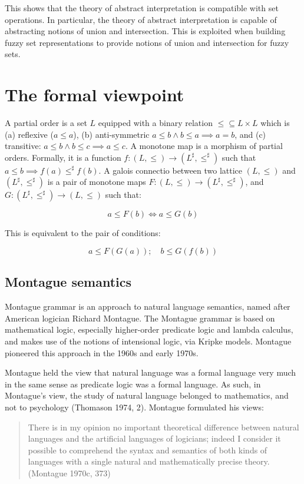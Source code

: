 \documentclass[11pt]{book}
\begin{document}
This shows that the theory of abstract interpretation is compatible with set operations. In particular, the theory of abstract interpretation is capable of abstracting notions of union and intersection. This is exploited when building fuzzy set representations to provide notions of union and intersection for fuzzy sets.

\section{The formal viewpoint}

A partial order is a set $L$ equipped with a binary relation $\leq \subseteq L \times L$
which is (a) reflexive ($a \leq a$), (b) anti-symmetric $a \leq b \land b \leq a \implies a = b$, and (c) transitive: $a \leq b \land b \leq c \implies a \leq c$.  A monotone map is a morphism of partial orders. Formally, it is a function $f: (L, \leq) \rightarrow (L^\sharp, \leq^\sharp)$ such that $a \leq b \implies f(a) \leq^\sharp f(b)$.  A galois connectio between two lattice $(L, \leq)$ and $(L^\sharp, \leq^\sharp)$ is a pair of monotone maps 
$F: (L, \leq) \rightarrow (L^\sharp, \leq^\sharp)$, and $G: (L^\sharp, \leq^\sharp) \rightarrow  (L, \leq)$ such that:

$$
a \leq F(b) \iff a \leq G(b)
$$ 

This is equivalent to the pair of conditions:

$$
a \leq F(G(a)); \quad b \leq G(f(b))
$$


\subsection{Montague semantics}

Montague grammar is an approach to natural language semantics, named after
American logician Richard Montague. The Montague grammar is based on
mathematical logic, especially higher-order predicate logic and lambda
calculus, and makes use of the notions of intensional logic, via Kripke models.
Montague pioneered this approach in the 1960s and early 1970s.

Montague held the view that natural language was a formal language very much in the same sense as predicate logic was a formal language. As such, in Montague’s view, the study of natural language belonged to mathematics, and not to psychology (Thomason 1974, 2). Montague formulated his views: %


\begin{quote}
	There is in my opinion no important theoretical difference between natural languages and the artificial languages of logicians; indeed I consider it possible to comprehend the syntax and semantics of both kinds of languages with a single natural and mathematically precise theory. (Montague 1970c, 373)
\end{quote}
\end{document}

